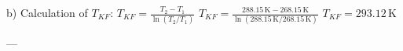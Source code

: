 b) Calculation of \( T_{KF} \):  
\( T_{KF} = \frac{T_2 - T_1}{\ln(T_2 / T_1)} \)  
\( T_{KF} = \frac{288.15 \, \text{K} - 268.15 \, \text{K}}{\ln(288.15 \, \text{K} / 268.15 \, \text{K})} \)  
\( T_{KF} = 293.12 \, \text{K} \)  

---